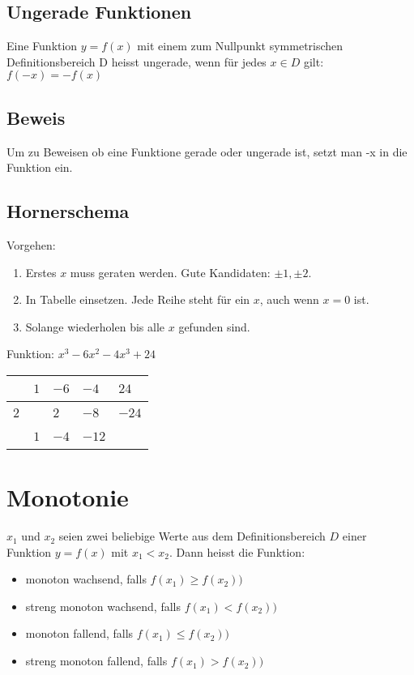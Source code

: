 \subsection{Ungerade Funktionen}
Eine Funktion \(y = f(x)\) mit einem zum Nullpunkt symmetrischen Definitionsbereich D heisst ungerade, wenn für jedes \(x \in D\) gilt:
\newline \(f(-x) = -f(x)\)

\subsection{Beweis}
Um zu Beweisen ob eine Funktione gerade oder ungerade ist, setzt man -x in die Funktion ein.

\subsection{Hornerschema}
Vorgehen:
\begin{enumerate}
	\item Erstes \(x\) muss geraten werden. Gute Kandidaten: \(\pm 1, \pm 2\). 
	\item In Tabelle einsetzen. Jede Reihe steht für ein \(x\), auch wenn \(x=0\) ist.
	\item Solange wiederholen bis alle \(x\) gefunden sind.
\end{enumerate}
Funktion: \( x^3-6x^2-4x^3+24\) \newline
\newline
\begin{tabular}{l|l|l|l|l}
	~ & \(1\) & \(-6\) & \(-4\) & \(24\) \\ \hline
	\(2\)& ~ & \(2\) & \(-8\) & \(-24\) \\ \hline
	~ & \(1\) & \(-4\) & \(-12\) & ~ \\ 
\end{tabular}

\section{Monotonie}
\(x_{1}\) und \(x_{2}\) seien zwei beliebige Werte aus dem Definitionsbereich \(D\) einer Funktion \(y = f(x)\) mit \(x_{1} < x_{2}\). Dann heisst die Funktion:
\begin{itemize}
	\item monoton wachsend, falls \(f(x_{1}) \ge f(x_{2}))\)
	\item streng monoton wachsend, falls \(f(x_{1}) < f(x_{2}))\)
	\item monoton fallend, falls \(f(x_{1}) \le f(x_{2}))\)
	\item streng monoton fallend, falls \(f(x_{1}) > f(x_{2}))\)
\end{itemize}

